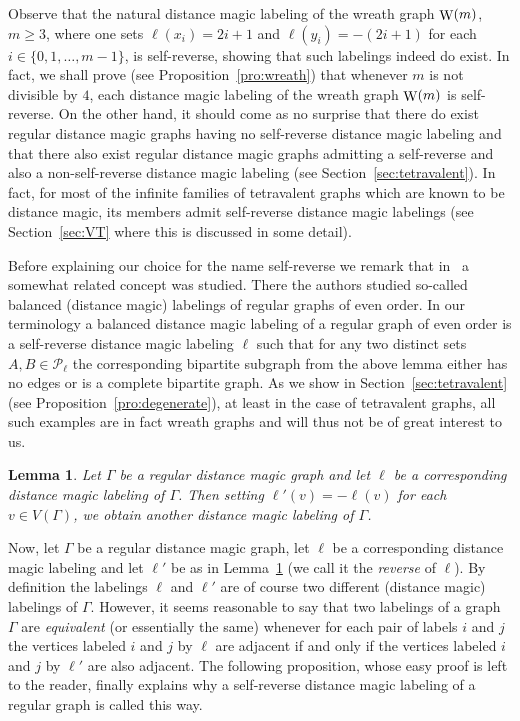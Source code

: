 \documentclass[11 pt,english]{article}
\newcommand{\G}{\Gamma}
\newcommand{\cP}{\mathcal{P}}
\newcommand{\Wr}{\mathop{\rm W}}
\newtheorem{lemma}[theorem]{Lemma}
\theoremstyle{definition}
\begin{document}
Observe that the natural distance magic labeling of the wreath graph $\Wr(m)$, $m \geq 3$, where one sets $\ell(x_i) = 2i+1$ and $\ell(y_i) = -(2i+1)$ for each $i \in \{0,1,\ldots, m-1\}$, is self-reverse, showing that such labelings indeed do exist. In fact, we shall prove (see Proposition~\ref{pro:wreath}) that whenever $m$ is not divisible by $4$, each distance magic labeling of the wreath graph $\Wr(m)$ is self-reverse. On the other hand, it should come as no surprise that there do exist regular distance magic graphs having no self-reverse distance magic labeling and that there also exist regular distance magic graphs admitting a self-reverse and also a non-self-reverse distance magic labeling (see Section~\ref{sec:tetravalent}). In fact, for most of the infinite families of tetravalent graphs which are known to be distance magic, its members admit self-reverse distance magic labelings (see Section~\ref{sec:VT} where this is discussed in some detail).

Before explaining our choice for the name self-reverse we remark that in~\cite{AnhCicPetTep15} a somewhat related concept was studied. There the authors studied so-called balanced (distance magic) labelings of regular graphs of even order. In our terminology a balanced distance magic labeling of a regular graph of even order is a self-reverse distance magic labeling $\ell$ such that for any two distinct sets $A, B \in \cP_\ell$ the corresponding bipartite subgraph from the above lemma either has no edges or is a complete bipartite graph. As we show in Section~\ref{sec:tetravalent} (see Proposition~\ref{pro:degenerate}), at least in the case of tetravalent graphs, all such examples are in fact wreath graphs and will thus not be of great interest to us.

\begin{lemma}
\label{le:reverse}
Let $\G$ be a regular distance magic graph and let $\ell$ be a corresponding distance magic labeling of $\G$. Then setting $\ell'(v) = -\ell(v)$ for each $v \in V(\G)$, we obtain another distance magic labeling of $\G$.
\end{lemma}

Now, let $\G$ be a regular distance magic graph, let $\ell$ be a corresponding distance magic labeling and let $\ell'$ be as in Lemma~\ref{le:reverse} (we call it the {\em reverse} of $\ell$). By definition the labelings $\ell$ and $\ell'$ are of course two different (distance magic) labelings of $\G$. However, it seems reasonable to say that two labelings of a graph $\G$ are {\em equivalent} (or essentially the same) whenever for each pair of labels $i$ and $j$ the vertices labeled $i$ and $j$ by $\ell$ are adjacent if and only if the vertices labeled $i$ and $j$ by $\ell'$ are also adjacent. The following proposition, whose easy proof is left to the reader, finally explains why a self-reverse distance magic labeling of a regular graph is called this way.
\end{document}
